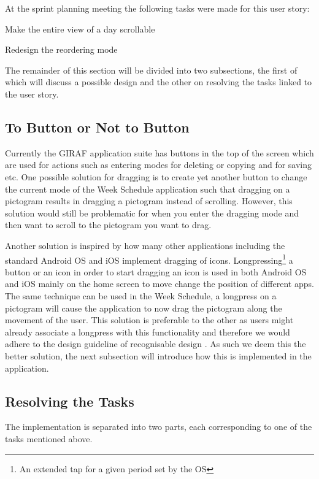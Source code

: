 \bigskip \noindent
At the sprint planning meeting the following tasks were made for this user story:
\begin{eletterate}
    \item Make the entire view of a day scrollable
    \item Redesign the reordering mode
\end{eletterate}
The remainder of this section will be divided into two subsections, the first of which will discuss a possible design and the other on resolving the tasks linked to the user story.

\subsection{To Button or Not to Button} %
Currently the GIRAF application suite has buttons in the top of the screen which are used for actions such as entering modes for deleting or copying and for saving etc.
One possible solution for dragging is to create yet another button to change the current mode of the Week Schedule application such that dragging on a pictogram results in dragging a pictogram instead of scrolling.
However, this solution would still be problematic for when you enter the dragging mode and then want to scroll to the pictogram you want to drag.

Another solution is inspired by how many other applications including the standard Android OS and iOS implement dragging of icons.
Longpressing\footnote{An extended tap for a given period set by the OS} a button or an icon in order to start dragging an icon is used in both Android OS and iOS mainly on the home screen to move change the position of different apps.
The same technique can be used in the Week Schedule, a longpress on a pictogram will cause the application to now drag the pictogram along the movement of the user.
This solution is preferable to the other as users might already associate a longpress with this functionality and therefore we would adhere to the design guideline of recognisable design \cite[p.~51]{DESIGNBOOK}.
As such we deem this the better solution, the next subsection will introduce how this is implemented in the application.

\subsection{Resolving the Tasks}
The implementation is separated into two parts, each corresponding to one of the tasks mentioned above.
